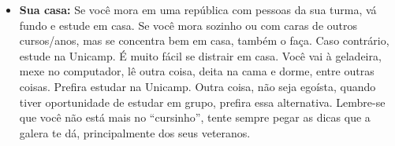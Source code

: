 \begin{itemize}
    \item  \textbf{Sua casa:} Se você mora em uma república com pessoas da sua
        turma, vá fundo e estude em casa. Se você mora sozinho ou com caras de
        outros cursos/anos, mas se concentra bem em casa, também o faça. Caso
        contrário, estude na Unicamp. É muito fácil se distrair em casa. Você
        vai à geladeira, mexe no computador, lê outra coisa, deita na cama e
        dorme, entre outras coisas. Prefira estudar na Unicamp. Outra coisa, não
        seja egoísta, quando tiver oportunidade de estudar em grupo, prefira
        essa alternativa. Lembre-se que você não está mais no ``cursinho'',
        tente sempre pegar as dicas que a galera te dá, principalmente dos seus
        veteranos.
\end{itemize}
